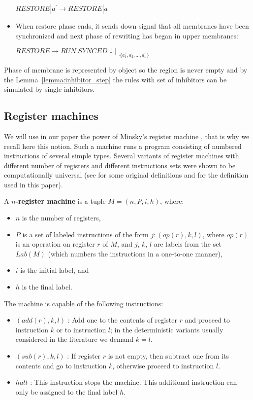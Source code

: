 \documentclass[a4paper,10pt]{article}
\begin{document}
\begin{dokaz}
\begin{itemize}
    $RESTORE|a^{\prime} \rightarrow RESTORE|a$

    \item When restore phase ends, it sends down signal that all membranes have been synchronized and next phase of rewriting has began in upper membranes:

    $RESTORE \rightarrow RUN|SYNCED\downarrow|_{\neg \{a_1^{\prime}, a_2^{\prime}, \dots, a_n^{\prime}\}}$
  \end{itemize}


  Phase of membrane is represented by object so the region is never empty and by the Lemma~\ref{lemma:inhibitor_step} the rules with set of inhibitors can be simulated by single inhibitors.
\end{dokaz}

\subsection{Register machines} %
\label{sub:register_machines}
  We will use in our paper the power of Minsky's register machine \cite{Ionescu:jucs_10_5:on_p_systems_with}, that is why we recall here this notion. Such a machine runs a program consisting of numbered instructions of several simple types. Several variants of register machines with different number of registers and different instructions sets were shown to be computationally universal (see \cite{Ibarra:2005:SPS:2111772.2111880} for some original definitions and \cite{Khrisna03threeuniversality} for the definition used in this paper).

  \begin{definicia}
    A {\bf $n$-register machine} is a tuple $M = (n,P,i,h)$, where:
    \begin{itemize}
      \item $n$ is the number of registers,
      \item $P$ is a set of labeled instructions of the form $j : (op(r),k,l)$, where $op(r)$ is an operation on register $r$ of $M$, and $j$, $k$, $l$ are labels from the set $Lab(M)$ (which numbers the instructions in a one-to-one manner),
      \item $i$ is the initial label, and
      \item $h$ is the final label.
    \end{itemize}
  \end{definicia}

  The machine is capable of the following instructions:
  \begin{itemize}
    \item $(add(r),k,l)$ : Add one to the contents of register $r$ and proceed to instruction $k$ or to instruction $l$; in the deterministic variants usually considered in the literature we demand $k = l$.
    \item $(sub(r),k,l)$ : If register $r$ is not empty, then subtract one from its contents and go to instruction $k$, otherwise proceed to instruction $l$.
    \item $halt$ : This instruction stops the machine. This additional instruction can only be assigned to the final label $h$.
  \end{itemize}
\end{document}

